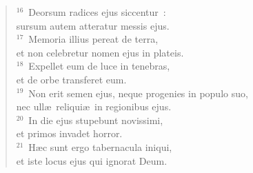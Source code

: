 \begin{flushleft}
\begin{verse}
${}^{16}$~Deorsum radices ejus siccentur~:\\ sursum autem atteratur messis ejus.\\
${}^{17}$~Memoria illius pereat de terra,\\ et non celebretur nomen ejus in plateis.\\
${}^{18}$~Expellet eum de luce in tenebras,\\ et de orbe transferet eum.\\
${}^{19}$~Non erit semen ejus, neque progenies in populo suo,\\ nec ull\ae\ reliqui\ae\ in regionibus ejus.\\
${}^{20}$~In die ejus stupebunt novissimi,\\ et primos invadet horror.\\
${}^{21}$~H\ae c sunt ergo tabernacula iniqui,\\ et iste locus ejus qui ignorat Deum.\end{verse}\end{flushleft}



